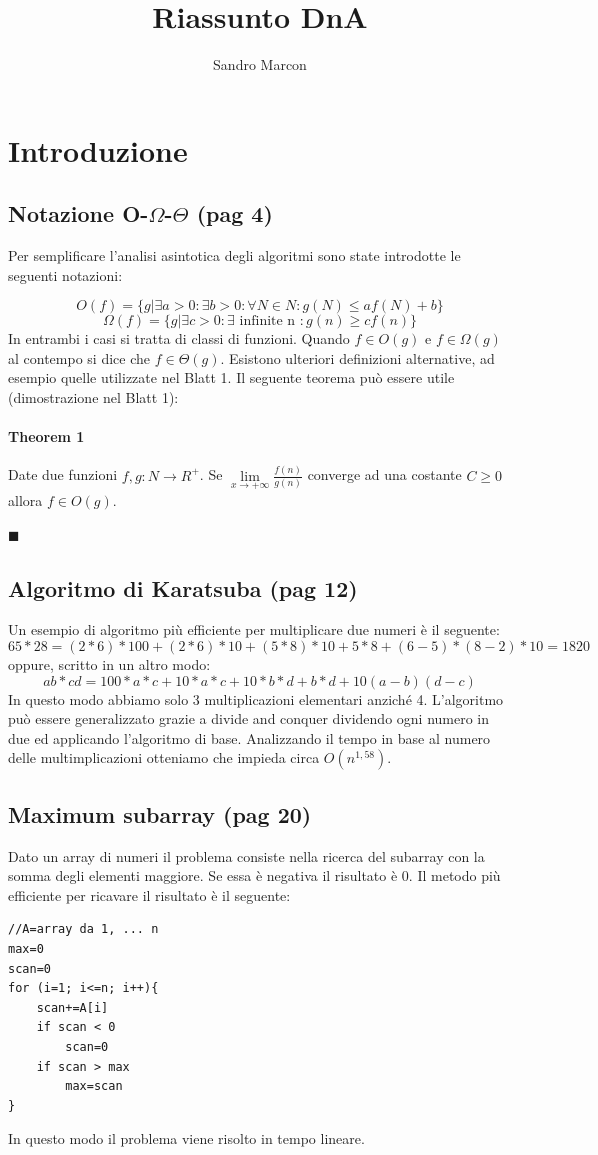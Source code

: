 \documentclass[a4paper]{book}
\author{Sandro Marcon}
\title{Riassunto DnA}
\newenvironment{mytheorem}[1]{\subsubsection*{Theorem #1}}{\begin{flushright}$\blacksquare$\end{flushright}}
\begin{document}
\chapter{Introduzione}
\section{Notazione O-$\Omega$-$\Theta$ (pag 4)}
Per semplificare l'analisi asintotica degli algoritmi sono state introdotte le 
seguenti notazioni:

$$O(f)=\{ g|\exists a>0: \exists b>0: \forall N \in N : g(N)\leq af(N)+b \}$$
$$\Omega (f)=\{ g|\exists c>0: \exists \mbox{ infinite n } : g(n) \geq cf(n) \}$$
In entrambi i casi si tratta di classi di funzioni. Quando $f \in O(g)$ e $f \in \Omega (g)$ al contempo si dice che $f \in \Theta (g)$. Esistono ulteriori definizioni alternative, ad esempio quelle utilizzate nel Blatt 1. Il seguente teorema può essere utile (dimostrazione nel Blatt 1):
\newtheorem{theorem}{Theorem}
\begin{mytheorem}{1}
Date due funzioni $ f,g: N \rightarrow R^{+} $. Se $ \lim\limits_{x \rightarrow +\infty} \frac{f(n)}{g(n)} $ converge ad una costante $C\geq 0$ allora $f \in O(g)$.
\end{mytheorem}
\section{Algoritmo di Karatsuba (pag 12)}
Un esempio di algoritmo più efficiente per multiplicare due numeri è il seguente:
$$65 * 28 = (2 * 6) * 100 + (2 * 6) * 10 + (5 * 8) * 10 + 5 * 8 + (6-5)*(8-2) * 10 = 1820 $$
oppure, scritto in un altro modo:
\[ab*cd=100*a*c+10*a*c+10*b*d+b*d+10(a-b)(d-c)\]
In questo modo abbiamo solo 3 multiplicazioni elementari anziché 4. L'algoritmo può essere generalizzato grazie a divide and conquer dividendo ogni numero in due ed applicando l'algoritmo di base. Analizzando il tempo in base al numero delle multimplicazioni otteniamo che impieda circa $O(n^{1,58})$.
\section{Maximum subarray (pag 20)}
Dato un array di numeri il problema consiste nella ricerca del subarray con la somma degli elementi maggiore. Se essa è negativa il risultato è 0. Il metodo più efficiente per ricavare il risultato è il seguente:
\begin{lstlisting}
//A=array da 1, ... n	
max=0	
scan=0
for (i=1; i<=n; i++){	
	scan+=A[i]
	if scan < 0
		scan=0
	if scan > max 
		max=scan
}			
\end{lstlisting}
In questo modo il problema viene risolto in tempo lineare.	
\end{document}
